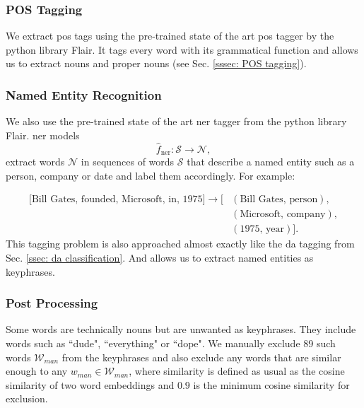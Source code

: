         \subsubsection{POS Tagging}
            We extract \gls{pos} tags using the pre-trained state of the art \gls{pos} tagger by the python library Flair\cite{flairNLP}. It tags every word with its grammatical function and allows us to extract nouns and proper nouns (see Sec. \ref{sssec: POS tagging}).

        \subsubsection{Named Entity Recognition}
            We also use the pre-trained state of the art \gls{ner} tagger from the python library Flair\cite{flairNLP}.
            \Gls{ner} models
            \begin{equation}
              \hat{f}_{\text{ner}}: \mathcal{S} \rightarrow \mathcal{N},
            \end{equation}
            extract words $\mathcal{N}$ in sequences of words $\mathcal{S}$ that describe a named entity such as a person, company or date and label them accordingly. For example:

        \begin{align*}
        \text{[Bill Gates, founded, Microsoft, in, 1975]} \rightarrow [& (\text{Bill Gates, person}), \\
                                                                       & (\text{Microsoft, company}), \\
                                                                       & (\text{1975, year})].
        \end{align*}
        This tagging problem is also approached almost exactly like the \gls{da} tagging from Sec. \ref{ssec: da classification}. And allows us to extract named entities as \glspl{keyphrase}.

        \subsubsection{Post Processing}
            Some words are technically nouns but are unwanted as \glspl{keyphrase}. They include words such as ``dude", ``everything" or ``dope". We manually exclude 89 such words $\mathcal{W}_{man}$ from the \glspl{keyphrase} and also exclude any words that are similar enough to any $w_{man} \in \mathcal{W}_{man}$, where similarity is defined as usual as the cosine similarity of two word \glspl{embedding} and $0.9$ is the minimum cosine similarity for exclusion.

